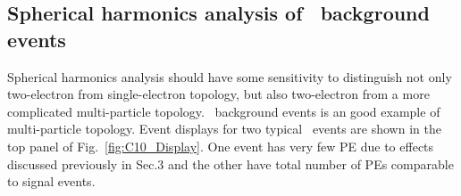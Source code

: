 \begin{comment}
The effects due to the presence of scintillation light and applying the default QE are shown in Fig.~\ref{fig:SL_topologies_all}. Spherical harmonics of the same three representative event topologies are now calculated using early light (photons with arrival time less than 33.5~ns) that contains both directional Cherenkov light and uniform scintillation light. The of number PE seen by each tube is reduced by the default QE. In this more realistic scenario, the higher order multiple moments, S2 and S3, no longer provide noticeable separation between different event topologies.


\begin{figure*}[h]
  \centering
  \texttt{[image: hS0vsS1\_topologies\_allLight\_VtxSmear0cm\_VtxShiftX0cm\_33p5ns\_center.pdf]}
  \texttt{[image: hS2vsS3\_topologies\_allLight\_VtxSmear0cm\_VtxShiftX0cm\_33p5ns\_center.pdf]}
  \texttt{[image: hS01\_topologies\_allLight\_VtxSmear0cm\_VtxShiftX0cm\_33p5ns\_center.pdf]}
  \caption{Spherical harmonics for three event topologies: two
    back-to-back 1.26~MeV electrons (\emph{black squares and black
      dotted line}), two 1.26~MeV electrons at 90$^{\circ}$ angle
    (\emph{blue triangles and blue dashed line}), and a single
    2.529~MeV electron representing $^{8}$B background (\emph{red
      crosses and red solid line}). Simulation of 1000 events
    originated at the center of the sphere. Separation between
    Cherenkov and scintillation light is implemented 33.5~ns cut on
    the photon arrival time. Perfect vertex reconstruction - true
    vertex position is used. \emph{Top left:} $S_0$ versus $S_1$
    scatter plot. Black dotted line is a linear fit of the
    90$^{\circ}$ topology and $^{8}$B events. Variable $S_{01}$ is
    defined as a projection of 2D distribution onto this linear
    fit. \emph{Top right:} $S_2$ versus $S_3$ scatter
    plot. \emph{Bottom:} $S_{01}$ distributions for the three
    topologies. These distributions are normalized to unit area for
    shape comparison}
\label{fig:SL_topologies_all}
\end{figure*}


\endgroup
\end{comment}


\subsection{Spherical harmonics analysis of \C~background events}
\label{subsec:c10_spherical_harmonics}
Spherical harmonics analysis should have some sensitivity to distinguish not only two-electron from single-electron topology, but also 
two-electron from a more complicated multi-particle topology. \C~background events is an good example of multi-particle topology. Event displays
for two typical \C~events are shown in the top panel of Fig.~\ref{fig:C10_Display}. One event has very few PE due to effects discussed 
previously in Sec.3 and the other have total number of PEs comparable to signal events.


